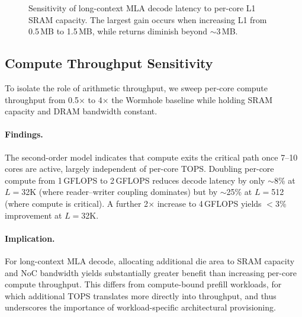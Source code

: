 \documentclass[sigconf, review, anonymous]{acmart}
\begin{document}
\begin{figure}[t]
  \centering
  \caption{Sensitivity of long-context MLA decode latency to per-core
    L1 SRAM capacity.  The largest gain occurs when increasing L1 from
    0.5\,MB to 1.5\,MB, while returns diminish beyond
    $\sim$3\,MB.}
  \label{fig:sram-sweep}
\end{figure}



\subsection{Compute Throughput Sensitivity}\label{sec:arch-tops}


To isolate the role of arithmetic throughput, we sweep per-core compute
throughput from 0.5$\times$ to 4$\times$ the Wormhole baseline while
holding SRAM capacity and DRAM bandwidth constant.

\paragraph{Findings.}
The second-order model indicates that compute exits the critical path
once 7--10 cores are active, largely independent of per-core TOPS.
Doubling per-core compute from 1\,GFLOPS to 2\,GFLOPS reduces decode
latency by only $\sim$8\% at $L{=}$32K (where reader--writer coupling
dominates) but by $\sim$25\% at $L{=}$512 (where compute is critical).
A further 2$\times$ increase to 4\,GFLOPS yields $<$3\% improvement
at $L{=}$32K.

\paragraph{Implication.}
For long-context MLA decode, allocating additional die area to SRAM
capacity and NoC bandwidth yields substantially greater benefit than
increasing per-core compute throughput.  This differs from
compute-bound prefill workloads, for which additional TOPS translates
more directly into throughput, and thus underscores the importance of
workload-specific architectural provisioning.
\end{document}

